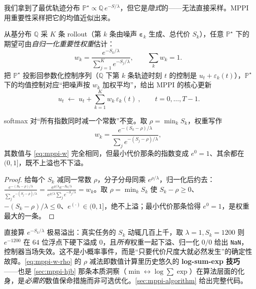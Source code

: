 我们拿到了最优轨迹分布 $\mathbb{P}^\star\propto\mathbb{Q}\,e^{-S/\lambda}$，但它是\emph{隐式}的——无法直接采样。MPPI 用重要性采样把它的均值近似出来。

\begin{theorem}\label{thm:mppi-weights}
从基分布 $\mathbb{Q}$ 采 $K$ 条 rollout（第 $k$ 条由噪声 $\boldsymbol{\varepsilon}_k$ 生成、总代价 $S_k$），任意 $\mathbb{P}^\star$ 下的期望可由\emph{自归一化重要性权重}估计：
\begin{equation}
  w_k=\frac{e^{-S_k/\lambda}}{\sum_{j=1}^{K}e^{-S_j/\lambda}},\qquad\sum_k w_k=1.
  \label{eq:mppi-w}
\end{equation}
把 $\mathbb{P}^\star$ 投影回参数化控制序列（$\mathbb{Q}$ 下第 $k$ 条轨迹时刻 $t$ 的控制是 $u_t+\varepsilon_k(t)$），$\mathbb{P}^\star$ 下的均值控制对应“把噪声按 $w_k$ 加权平均”，给出 MPPI 的核心更新
\begin{equation}
  \boxed{\ u_t\;\leftarrow\;u_t+\sum_{k=1}^{K}w_k\,\varepsilon_k(t)\ },\qquad t=0,\dots,T-1.
  \label{eq:mppi-update}
\end{equation}
\end{theorem}

\begin{theorem}\label{thm:mppi-rho}
softmax 对“所有指数同时减一个常数”不变。取 $\rho=\min_k S_k$，权重写作
\begin{equation}
  w_k=\frac{e^{-(S_k-\rho)/\lambda}}{\sum_j e^{-(S_j-\rho)/\lambda}},
  \label{eq:mppi-w-rho}
\end{equation}
其数值与 \cref{eq:mppi-w} 完全相同，但最小代价那条的指数变成 $e^0=1$、其余都在 $(0,1]$，既不上溢也不下溢。
\end{theorem}
\begin{proof}
给每个 $S_k$ 减同一常数 $\rho$，分子分母同乘 $e^{\rho/\lambda}$，归一化后约去：$\tfrac{e^{-(S_k-\rho)/\lambda}}{\sum_j e^{-(S_j-\rho)/\lambda}}=\tfrac{e^{\rho/\lambda}e^{-S_k/\lambda}}{e^{\rho/\lambda}\sum_j e^{-S_j/\lambda}}=w_k$。取 $\rho=\min_k S_k$ 使 $S_k-\rho\ge0$、$-(S_k-\rho)/\lambda\le0$、$e^{(\cdot)}\in(0,1]$，绝不上溢；最小代价那条恰得 $e^0=1$，是权重最大的一条。
\end{proof}

\noindent 直接算 $e^{-S_k/\lambda}$ 极易溢出：真实任务的 $S_k$ 动辄几百上千，取 $\lambda=1,S_k=1200$ 则 $e^{-1200}$ 在 $64$ 位浮点下硬下溢成 $0$，且\emph{所有}权重一起下溢、归一化 $0/0$ 给出 \texttt{NaN}，控制器当场失效。这不是小概率事件，而是“只要代价尺度大就必然发生”的确定性故障。\cref{eq:mppi-w-rho} 的 $\rho$ 减法即数值计算里历史悠久的 \textbf{log-sum-exp 技巧}——也是 \cref{sec:mppi-hjb} 那条本质洞察（$\min\leftrightarrow\log\sum\exp$）在算法层面的化身，是\emph{必需的}数值保命措施而非可选优化。\cref{sec:mppi-algorithm} 给出完整代码。

